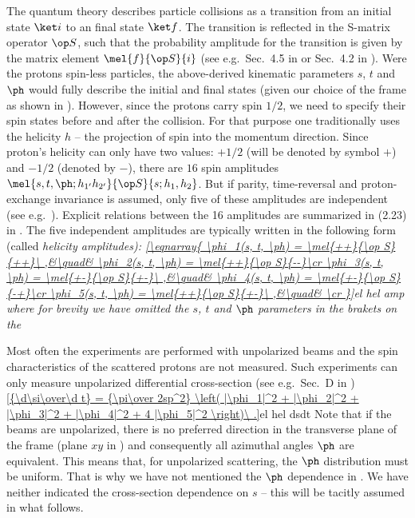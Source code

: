 The quantum theory describes particle collisions as a transition from an initial state $\ket i$ to an final state $\ket f$. The transition is reflected in the S-matrix operator $\op S$, such that the probability amplitude for the transition is given by the matrix element $\mel{f}{\op S}{i}$ (see e.g.~Sec.~4.5 in  or Sec.~4.2 in ). Were the protons spin-less particles, the above-derived kinematic parameters $s$, $t$ and $\ph$ would fully describe the initial and final states (given our choice of the  frame as shown in ). However, since the protons carry spin $1/2$, we need to specify their spin states before and after the collision. For that purpose one traditionally uses the helicity $h$ -- the projection of spin into the momentum direction. Since proton's helicity can only have two values: $+1/2$ (will be denoted by symbol $+$) and $-1/2$ (denoted by $-$), there are $16$ spin amplitudes $\mel{s, t, \ph; h_{1'} h_{2'}}{\op S}{s; h_1, h_2}$. But if parity, time-reversal and proton-exchange invariance is assumed, only five of these amplitudes are independent (see e.g.~). Explicit relations between the 16 amplitudes are summarized in (2.23) in . The five independent amplitudes are typically written in the following form (called \em{helicity amplitudes}):
\eqref{\eqnarray{
\phi_1(s, t, \ph) = \mel{++}{\op S}{++}\ ,&\quad& \phi_2(s, t, \ph) = \mel{++}{\op S}{--}\cr
\phi_3(s, t, \ph) = \mel{+-}{\op S}{+-}\ ,&\quad& \phi_4(s, t, \ph) = \mel{+-}{\op S}{-+}\cr
\phi_5(s, t, \ph) = \mel{++}{\op S}{+-}\ ,&\quad& \cr
}}{el hel amp}
where for brevity we have omitted the $s$, $t$ and $\ph$ parameters in the brakets on the \rhs

Most often the experiments are performed with unpolarized beams and the spin characteristics of the scattered protons are not measured. Such experiments can only measure unpolarized differential cross-section (see e.g.~Sec.~D in )
\eqref{{\d\si\over\d t} = {\pi\over 2sp^2} \left( |\phi_1|^2 + |\phi_2|^2 + |\phi_3|^2 + |\phi_4|^2 + 4 |\phi_5|^2 \right)\ .}{el hel dsdt}
Note that if the beams are unpolarized, there is no preferred direction in the transverse plane of the  frame (plane $xy$ in ) and consequently all azimuthal angles $\ph$ are equivalent. This means that, for unpolarized scattering, the $\ph$ distribution must be uniform. That is why we have not mentioned the $\ph$ dependence in . We have neither indicated the cross-section dependence on $s$ -- this will be tacitly assumed in what follows.


